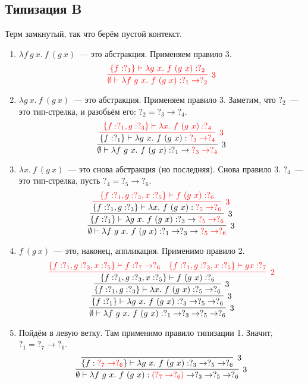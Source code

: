 \documentclass[12pt, a4paper] {article}
\begin{document}
\subsection{Типизация \textbf{B}}

Терм замкнутый, так что берём пустой контекст.

\begin{enumerate}
  \item $\lambda f~g~x.~f~(g~x)$~--- это абстракция. Применяем правило 3.
    $${\color{red} \infer[3]{\emptyset \vdash \lambda f~g~x.~f~(g~x) : ?_1 \to ?_2}
            {\{f: ?_1\} \vdash \lambda g~x.~f~(g~x) : ?_2} }$$
  \item $\lambda g~x.~f~(g~x)$~--- это абстракция. Применяем правило 3. Заметим,
    что $?_2$~--- это тип-стрелка, и разобьём его: $?_2 = ?_3 \to ?_4$.
    $$\infer[3]{\emptyset \vdash \lambda f~g~x.~f~(g~x) : ?_1 \to {\color{red} ?_3 \to ?_4}}{
      \color{red}
      \infer[3]{\color{defaultcolor} \{f: ?_1\} \vdash \lambda g~x.~f~(g~x) : {\color{red} ?_3 \to ?_4}}{
               {\{f: ?_1, g: ?_3\} \vdash \lambda x.~f~(g~x) : ?_4 }
      }}$$
  \item $\lambda x.~f~(g~x)$~--- это снова абстракция (но последняя). Снова
    правило 3. $?_4$~--- это тип-стрелка, пусть $?_4 = ?_5 \to ?_6$.
    $$\infer[3]{\emptyset \vdash \lambda f~g~x.~f~(g~x) : ?_1 \to ?_3 \to {\color{red}?_5 \to ?_6}}{
      \infer[3]{\{f: ?_1\} \vdash \lambda g~x.~f~(g~x) : ?_3 \to {\color{red}?_5 \to ?_6}}{
      \color{red} \infer[3]{\color{defaultcolor} \{f: ?_1, g: ?_3\} \vdash \lambda x.~f~(g~x) : {\color{red}?_5 \to ?_6} }{
               {\{f: ?_1, g: ?_3, x: ?_5\} \vdash f~(g~x) : ?_6 }
      }}}$$
  \item $f~(g~x)$~--- это, наконец, аппликация. Применимо правило 2.
    $$\infer[3]{\emptyset \vdash \lambda f~g~x.~f~(g~x) : ?_1 \to ?_3 \to ?_5 \to ?_6}{
      \infer[3]{\{f: ?_1\} \vdash \lambda g~x.~f~(g~x) : ?_3 \to ?_5 \to ?_6}{
      \infer[3]{\{f: ?_1, g: ?_3\} \vdash \lambda x.~f~(g~x) : ?_5 \to ?_6 }{
      \color{red} \infer[2]{\color{defaultcolor} \{f: ?_1, g: ?_3, x: ?_5\} \vdash f~(g~x) : ?_6 }{
               \{f: ?_1, g: ?_3, x: ?_5\} \vdash f : ?_7 \to ?_6 & \{f: ?_1, g: ?_3, x: ?_5\} \vdash g x : ?_7
      }}}}$$
  \item Пойдём в левую ветку. Там применимо правило типизации 1. Значит,
    $?_1 = ?_7 \to ?_6$.
    $$\infer[3]{\emptyset \vdash \lambda f~g~x.~f~(g~x) : {\color{red} (?_7 \to ?_6)} \to ?_3 \to ?_5 \to ?_6}{
      \infer[3]{\{f: {\color{red} ?_7 \to ?_6}\} \vdash \lambda g~x.~f~(g~x) : ?_3 \to ?_5 \to ?_6}{
}}$$
\end{enumerate}
\end{document}
